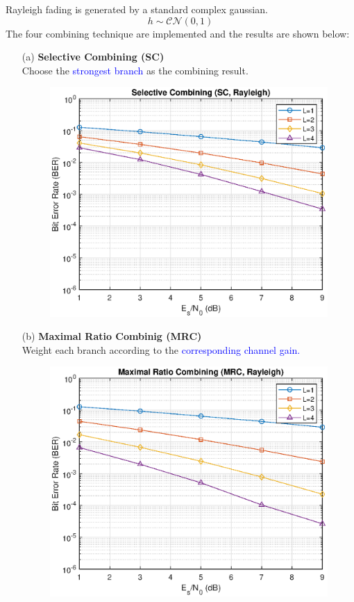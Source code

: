 Rayleigh fading is generated by a standard complex gaussian.
\begin{equation*}
    h \sim \mathcal{CN}(0, 1)
\end{equation*}
The four combining technique are implemented and the results are shown below:
\begin{itemize}
    \item[(a)] \textbf{Selective Combining (SC)} \hfill \\
    Choose the \textcolor{blue}{strongest branch} as the combining result.
    \begin{figure}[H]
        \centering
        \includegraphics[scale = 0.85]{SC_rayleigh.eps}
    \end{figure}
    \vfill
    \item[(b)] \textbf{Maximal Ratio Combinig (MRC)} \hfill \\
    Weight each branch according to the \textcolor{blue}{corresponding channel gain.}
    \begin{figure}[H]
        \centering
        \includegraphics[scale = 0.85]{MRC_rayleigh.eps}

\end{figure}
\end{itemize}
